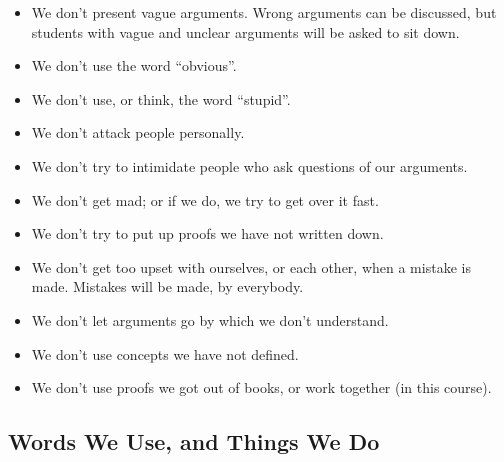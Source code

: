 \documentclass{article}
\begin{document}
\begin{itemize}

  \item We don't present vague arguments. Wrong arguments can be discussed, but students with vague and unclear arguments will be asked to sit down.

  \item We don't use the word ``obvious''.

  \item We don't use, or think, the word ``stupid''.

  \item We don't attack people personally.

  \item We don't try to intimidate people who ask questions of our arguments.

  \item We don't get mad; or if we do, we try to get over it fast.

  \item We don't try to put up proofs we have not written down.

  \item We don't get too upset with ourselves, or each other, when a mistake is made. Mistakes will be made, by everybody.

  \item We don't let arguments go by which we don't understand.

  \item We don't use concepts we have not defined.

  \item We don't use proofs we got out of books, or work together (in this course).

\end{itemize}


\subsection{Words We Use, and Things We Do}
\end{document}
